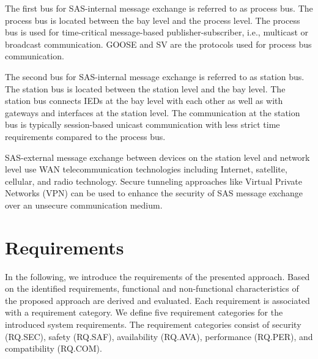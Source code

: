 The first bus for SAS-internal message exchange is referred to as process bus.
The process bus is located between the bay level and the process level.
The process bus is used for time-critical message-based publisher-subscriber, i.e., multicast or broadcast communication.
GOOSE and SV are the protocols used for process bus communication.

The second bus for SAS-internal message exchange is referred to as station bus.
The station bus is located between the station level and the bay level.
The station bus connects IEDs at the bay level with each other as well as with gateways and interfaces at the station level.
The communication at the station bus is typically session-based unicast communication with less strict time requirements compared to the process bus.

SAS-external message exchange between devices on the station level and network level use WAN telecommunication technologies including Internet, satellite, cellular, and radio technology.
Secure tunneling approaches like Virtual Private Networks (VPN) can be used to enhance the security of SAS message exchange over an unsecure communication medium.

\section{Requirements}
\label{sec:approach:requirements}
In the following, we introduce the requirements of the presented approach.
Based on the identified requirements, functional and non-functional characteristics of the proposed approach are derived and evaluated.
Each requirement is associated with a requirement category.
We define five requirement categories for the introduced system requirements.
The requirement categories consist of security (RQ.SEC), safety (RQ.SAF), availability (RQ.AVA), performance (RQ.PER), and compatibility (RQ.COM).

